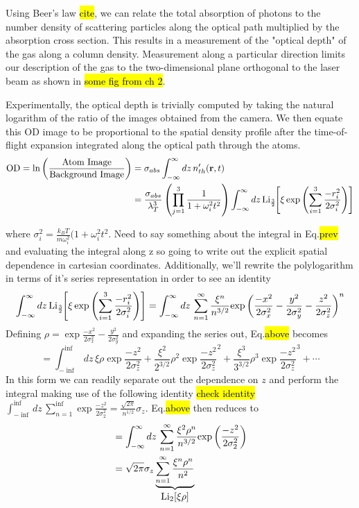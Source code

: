 Using Beer's law \hl{cite}, we can relate the total absorption of photons to the number density of scattering particles along the optical path multiplied by the absorption cross section. This results in a measurement of the "optical depth" of the gas along a column density. Measurement along a particular direction limits our description of the gas to the two-dimensional plane orthogonal to the laser beam as shown in \hl{some fig from ch 2}.

Experimentally, the optical depth is trivially computed by taking the natural logarithm of the ratio of the images obtained from the camera. We then equate this OD image to be proportional to the spatial density profile after the time-of-flight expansion integrated along the optical path through the atoms.
\begin{equation}
\begin{split}
\text{OD} = \text{ln} \left( \frac{\text{Atom Image}}{\text{Background Image}} \right) &= \sigma_{abs} \int_{-\infty}^{\infty} dz \, n_{th}'(\mathbf{r},t) \\ 
&= \frac{\sigma_{abs}}{\lambda_T^3} \left( \prod_{j=1}^3 \frac{1}{1+\omega_i^2t^2}\right) \int_{-\infty}^{\infty} dz\,\text{Li}_{\scriptscriptstyle\frac{3}{2}\!}\!\left[ \xi \,\text{exp}\left( {\sum_{i=1}^3 \frac{-r_i^2}{2\sigma_i^2}} \right) \right]
\end{split}
\end{equation}

where $\sigma_i^2 = \frac{k_BT}{m\omega_i^2}(1+\omega_i^2t^2$. Need to say something about the integral in Eq.\hl{prev} and evaluating the integral along z so going to write out the explicit spatial dependence in cartesian coordinates. Additionally, we'll rewrite the polylogarithm in terms of it's series representation in order to see an identity
\begin{equation}
\int_{-\infty}^{\infty} dz\,\text{Li}_{\scriptscriptstyle\frac{3}{2}\!}\!\left[ \xi \,\text{exp}\left( {\sum_{i=1}^3 \frac{-r_i^2}{2\sigma_i^2}} \right) \right] = 
\int_{-\infty}^{\infty} dz\, \sum_{n=1}^{\infty} \frac{\xi^n}{n^{3/2}}\text{exp}\left( {\frac{-x^2}{2\sigma_x^2} - \frac{y^2}{2\sigma_y^2} - \frac{z^2}{2\sigma_z^2}} \right)^n
\end{equation}
Defining $\rho=\exp{\frac{-x^2}{2\sigma_x^2} - \frac{y^2}{2\sigma_y^2}}$ and expanding the series out, Eq.\hl{above} becomes
\begin{equation}
=\int_{-\inf}^{\inf} dz\, \xi\rho\exp{\frac{-z^2}{2\sigma_z^2}} + 
 \frac{\xi^2}{2^{3/2}}\rho^2\exp{\frac{-z^2}{2\sigma_z^2}}^2 + 
 \frac{\xi^3}{3^{3/2}}\rho^3\exp{\frac{-z^2}{2\sigma_z^2}}^3 + \cdots
\end{equation}
In this form we can readily separate out the dependence on $z$ and perform the integral making use of the following identity \hl{check identity} $\displaystyle\int_{-\inf}^{\inf} dz\, \sum_{n=1}^{\inf}\exp{\frac{-z^2}{2\sigma_2^2}} = \frac{\sqrt{2\pi}}{n^{1/2}}\sigma_z$. Eq.\hl{above} then reduces to
\begin{equation}
\begin{split}
&=\int_{-\infty}^{\infty} dz\, \sum_{n=1}^{\infty}\frac{\xi^2\rho^n}{n^{3/2}}\text{exp}\left( {\frac{-z^2}{2\sigma_2^2}} \right) \\
&=\sqrt{2\pi}\sigma_z\underbrace{\sum_{n=1}^{\infty}\frac{\xi^n\rho^n}{n^2}}_{\displaystyle\text{Li}_{2}\!\left[ \xi\rho \right]}
\end{split}
\end{equation}

